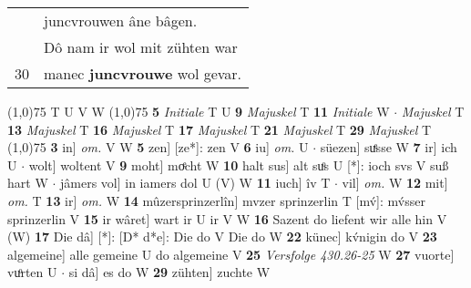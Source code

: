\documentclass[8pt,a4paper,notitlepage]{article}
\begin{document}
\begin{table}[ht]
\begin{minipage}[t]{0.5\linewidth}
\begin{tabular}{rl}
 & juncvrouwen âne bâgen.\\ 
 & Dô nam ir wol mit zühten war\\ 
30 & manec \textbf{juncvrouwe} wol gevar.\\ 
\end{tabular}
\scriptsize
\line(1,0){75} \newline
T U V W \newline
\line(1,0){75} \newline
\textbf{5} \textit{Initiale} T U  \textbf{9} \textit{Majuskel} T  \textbf{11} \textit{Initiale} W   $\cdot$ \textit{Majuskel} T  \textbf{13} \textit{Majuskel} T  \textbf{16} \textit{Majuskel} T  \textbf{17} \textit{Majuskel} T  \textbf{21} \textit{Majuskel} T  \textbf{29} \textit{Majuskel} T  \newline
\line(1,0){75} \newline
\textbf{3} in] \textit{om.} V W \textbf{5} zen] [ze*]: zen V \textbf{6} iu] \textit{om.} U  $\cdot$ süezen] suͤsse W \textbf{7} ir] ich U  $\cdot$ wolt] woltent V \textbf{9} moht] moͤcht W \textbf{10} halt sus] alt suͦs U [*]: ioch svs V suß hart W  $\cdot$ jâmers vol] in iamers dol U (V) W \textbf{11} iuch] îv T  $\cdot$ vil] \textit{om.} W \textbf{12} mit] \textit{om.} T \textbf{13} ir] \textit{om.} W \textbf{14} mûzersprinzerlîn] mvzer sprinzerlin T [mv́]: mv́sser sprinzerlin V \textbf{15} ir wâret] wart ir U ir V W \textbf{16} Sazent do liefent wir alle hin V (W) \textbf{17} Die dâ] [*]: [D* d*e]: Die do V Die do W \textbf{22} künec] kv́nigin do V \textbf{23} algemeine] alle gemeine U do algemeine V \textbf{25} \textit{Versfolge 430.26-25} W  \textbf{27} vuorte] vuͦrten U  $\cdot$ si dâ] es do W \textbf{29} zühten] zuchte W \newline
\end{minipage}
\end{table}
\end{document}
